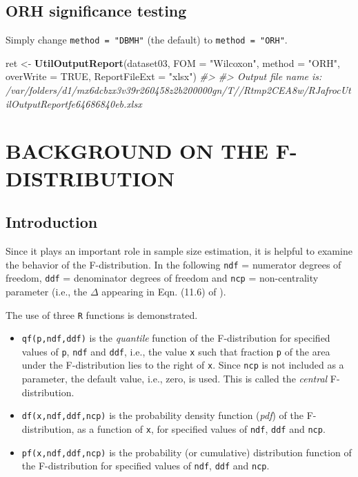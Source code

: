 \documentclass[]{book}
\newenvironment{Shaded}{\begin{snugshade}}{\end{snugshade}}
\newcommand{\CommentTok}[1]{\textcolor[rgb]{0.56,0.35,0.01}{\textit{#1}}}
\newcommand{\DataTypeTok}[1]{\textcolor[rgb]{0.13,0.29,0.53}{#1}}
\newcommand{\KeywordTok}[1]{\textcolor[rgb]{0.13,0.29,0.53}{\textbf{#1}}}
\newcommand{\NormalTok}[1]{#1}
\newcommand{\OtherTok}[1]{\textcolor[rgb]{0.56,0.35,0.01}{#1}}
\newcommand{\StringTok}[1]{\textcolor[rgb]{0.31,0.60,0.02}{#1}}
\begin{document}
\hypertarget{orh-significance-testing-1}{%
\section{ORH significance testing}\label{orh-significance-testing-1}}

Simply change \texttt{method\ =\ "DBMH"} (the default) to \texttt{method\ =\ "ORH"}.

\begin{Shaded}
\begin{Highlighting}[]
\NormalTok{ret <-}\StringTok{ }\KeywordTok{UtilOutputReport}\NormalTok{(dataset03, }\DataTypeTok{FOM =} \StringTok{"Wilcoxon"}\NormalTok{, }\DataTypeTok{method =} \StringTok{"ORH"}\NormalTok{, }\DataTypeTok{overWrite =} \OtherTok{TRUE}\NormalTok{, }\DataTypeTok{ReportFileExt =} \StringTok{"xlsx"}\NormalTok{)}
\CommentTok{#> }
\CommentTok{#> Output file name is:      /var/folders/d1/mx6dcbzx3v39r260458z2b200000gn/T//Rtmp2CEA8w/RJafrocUtilOutputReportfe64686840eb.xlsx}
\end{Highlighting}
\end{Shaded}

\hypertarget{SSFDistr}{%
\chapter{BACKGROUND ON THE F-DISTRIBUTION}\label{SSFDistr}}

\hypertarget{introduction-6}{%
\section{Introduction}\label{introduction-6}}

Since it plays an important role in sample size estimation, it is helpful to examine the behavior of the F-distribution. In the following \texttt{ndf} = numerator degrees of freedom, \texttt{ddf} = denominator degrees of freedom and \texttt{ncp} = non-centrality parameter (i.e., the \(\Delta\) appearing in Eqn. (11.6) of \citep{RN2680}).

The use of three \texttt{R} functions is demonstrated.

\begin{itemize}
\item
  \texttt{qf(p,ndf,ddf)} is the \emph{quantile} function of the F-distribution for specified values of \texttt{p}, \texttt{ndf} and \texttt{ddf}, i.e., the value \texttt{x} such that fraction \texttt{p} of the area under the F-distribution lies to the right of \texttt{x}. Since \texttt{ncp} is not included as a parameter, the default value, i.e., zero, is used. This is called the \emph{central} F-distribution.
\item
  \texttt{df(x,ndf,ddf,ncp)} is the probability density function (\emph{pdf}) of the F-distribution, as a function of \texttt{x}, for specified values of \texttt{ndf}, \texttt{ddf} and \texttt{ncp}.
\item
  \texttt{pf(x,ndf,ddf,ncp)} is the probability (or cumulative) distribution function of the F-distribution for specified values of \texttt{ndf}, \texttt{ddf} and \texttt{ncp}.
\end{itemize}
\end{document}

